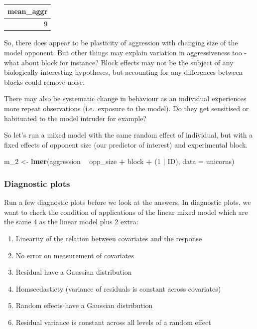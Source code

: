 \documentclass[
  12pt,
]{book}
\newenvironment{Shaded}{\begin{snugshade}}{\end{snugshade}}
\newcommand{\DataTypeTok}[1]{\textcolor[rgb]{0.13,0.29,0.53}{#1}}
\newcommand{\DecValTok}[1]{\textcolor[rgb]{0.00,0.00,0.81}{#1}}
\newcommand{\KeywordTok}[1]{\textcolor[rgb]{0.13,0.29,0.53}{\textbf{#1}}}
\newcommand{\NormalTok}[1]{#1}
\newcommand{\OperatorTok}[1]{\textcolor[rgb]{0.81,0.36,0.00}{\textbf{#1}}}
\newcommand{\StringTok}[1]{\textcolor[rgb]{0.31,0.60,0.02}{#1}}
\providecommand{\tightlist}{%
  \setlength{\itemsep}{0pt}\setlength{\parskip}{0pt}}
\begin{document}
\begin{tabular}{r}
\hline
mean\_aggr\\
\hline
9\\
\hline
\end{tabular}

So, there does appear to be plasticity of aggression with changing size of the model opponent. But other things may explain variation in aggressiveness too - what about block for instance? Block effects may not be the subject of any biologically interesting hypotheses, but accounting for any differences between blocks could remove noise.

There may also be systematic change in behaviour as an individual experiences more repeat observations (i.e.~exposure to the model). Do they get sensitised or habituated to the model intruder for example?

So let's run a mixed model with the same random effect of individual, but with a fixed effects of opponent size (our predictor of interest) and experimental block.

\begin{Shaded}
\begin{Highlighting}[]
\NormalTok{m_}\DecValTok{2}\NormalTok{ <-}\StringTok{ }\KeywordTok{lmer}\NormalTok{(aggression }\OperatorTok{~}\StringTok{ }\NormalTok{opp_size  }\OperatorTok{+}\StringTok{ }\NormalTok{block }\OperatorTok{+}\StringTok{ }\NormalTok{(}\DecValTok{1} \OperatorTok{|}\StringTok{ }\NormalTok{ID), }\DataTypeTok{data =}\NormalTok{ unicorns)}
\end{Highlighting}
\end{Shaded}

\hypertarget{diagnostic-plots}{%
\subsubsection{Diagnostic plots}\label{diagnostic-plots}}

Run a few diagnostic plots before we look at the answers. In diagnostic plots, we want to check the condition of applications of the linear mixed model which are the same 4 as the linear model plus 2 extra:

\begin{enumerate}
\def\labelenumi{\arabic{enumi}.}
\tightlist
\item
  Linearity of the relation between covariates and the response
\item
  No error on measurement of covariates
\item
  Residual have a Gaussian distribution
\item
  Homscedasticty (variance of residuals is constant across covariates)
\item
  Random effects have a Gaussian distribution
\item
  Residual variance is constant across all levels of a random effect
\end{enumerate}
\end{document}
